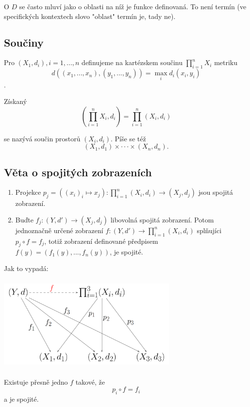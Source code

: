 \documentclass[10pt]{article}
\begin{document}
O $D$ se často mluví jako o oblasti na níž je funkce definovaná. To není termín (ve specifických kontextech slovo "oblast" termín 
je, tady ne).
\noindent

\subsection{Součiny}
\hspace{1.2mm}
Pro $(X_1,d_i), i = 1,...,n$ definujeme na kartézskem součinu $\prod^n_{i=1}X_i$ metriku
\[d((x_1,...,x_n),(y_1,...,y_n)) = \max_i d_i(x_i,y_i)\].

Získaný
\[\left(\prod^n_{i=1}X_i,d_i\right) = \prod^n_{i=1}(X_i,d_i)\]

se nazývá součin prostorů $(X_i, d_i)$. Píše se též 
\[(X_1,d_1) \times \cdot \cdot \cdot \times (X_n,d_n).\]
\noindent

\subsection{Věta o spojitých zobrazeních}
\begin{enumerate}
\item Projekce $p_j = ((x_i)_i \mapsto x_j) : \prod^n_{i=1}(X_i,d_i) \rightarrow (X_j,d_j)$ jsou spojitá zobrazení.

\item Buďte $f_j:(Y,d') \rightarrow (X_j,d_j)$ libovolná spojitá zobrazení. Potom jednoznačně určené zobrazení 
$f:(Y,d') \rightarrow \prod^n_{i=1}(X_i,d_i)$ splňujíci $p_j \circ f = f_j$, totiž zobrazení definované předpisem
$f(y) = (f_1(y),...,f_n(y))$, je spojité.
\end{enumerate}

Jak to vypadá:
\begin{center}
\includegraphics[width=9cm,height=4.8cm]{ipkm.png}
\end{center}
Existuje přesně jedno $f$ takové, že 
\[p_i \circ f = f_i\]
a je spojité.
\end{document}
